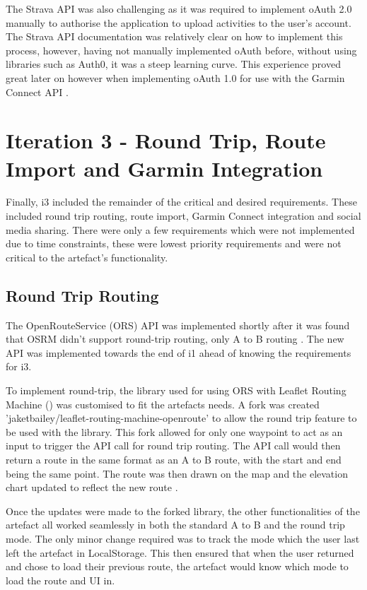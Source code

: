 The Strava API was also challenging as it was required to implement oAuth 2.0 manually to authorise the application to upload activities to the user's account. The Strava API documentation was relatively clear on how to implement this process, however, having not manually implemented oAuth before, without using libraries such as Auth0, it was a steep learning curve. This experience proved great later on however when implementing oAuth 1.0 for use with the Garmin Connect API .


\clearpage
\section{Iteration 3 - Round Trip, Route Import and Garmin Integration}
\label{implementation:iteration3}

Finally, i3 included the remainder of the critical and desired requirements. These included round trip routing, route import, Garmin Connect integration and social media sharing. There were only a few requirements which were not implemented due to time constraints, these were lowest priority requirements and were not critical to the artefact's functionality.

\subsection{Round Trip Routing}
\label{iteration3:round-trip}

The OpenRouteService (ORS) API was implemented shortly after it was found that OSRM didn't support round-trip routing, only A to B routing . The new API was implemented towards the end of i1 ahead of knowing the requirements for i3. 

To implement round-trip, the library used for using ORS with Leaflet Routing Machine (\cite{noauthor_gegewebleaflet-routing-machine-openroute_2020}) was customised to fit the artefacts needs. A fork was created 'jaketbailey/leaflet-routing-machine-openroute' to allow the round trip feature to be used with the library. This fork allowed for only one waypoint to act as an input to trigger the API call for round trip routing. The API call would then return a route in the same format as an A to B route, with the start and end being the same point. The route was then drawn on the map and the elevation chart updated to reflect the new route .

Once the updates were made to the forked library, the other functionalities of the artefact all worked seamlessly in both the standard A to B and the round trip mode. The only minor change required was to track the mode which the user last left the artefact in LocalStorage. This then ensured that when the user returned and chose to load their previous route, the artefact would know which mode to load the route and UI in.

